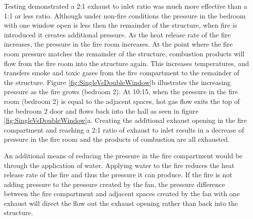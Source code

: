 \documentclass{article}
\begin{document}
Testing demonstrated a 2:1 exhaust to inlet ratio was much more effective than a 1:1 or less ratio. Although under non-fire conditions the pressure in the bedroom with one window open is less then the remainder of the structure, when fire is introduced it creates additional pressure. As the heat release rate of the fire increases, the pressure in the fire room increases. At the point where the fire room pressure matches the remainder of the structure, combustion products will flow from the fire room into the structure again. This increases temperatures, and transfers smoke and toxic gases from the fire compartment to the remainder of the structure. Figure \ref{fig:SingleVsDoubleWindow}b illustrates the increasing pressure as the fire grows (bedroom 2). At 10:15, when the pressure in the fire room (bedroom 2) is equal to the adjacent spaces, hot gas flow exits the top of the bedroom 2 door and flows back into the hall as seen in  figure \ref{fig:SingleVsDoubleWindow}a. Creating the additional exhaust opening in the fire compartment and reaching a 2:1 ratio of exhaust to inlet results in a decrease of pressure in the fire room and the products of combustion are all exhausted. 

An additional means of reducing the pressure in the fire compartment would be through the application of water. Applying water to the fire reduces the heat release rate of the fire and thus the pressure it can produce. If the fire is not adding pressure to the pressure created by the fan, the pressure difference between the fire compartment and adjacent spaces created by the fan with one exhaust will direct the flow out the exhaust opening rather than back into the structure. 
\end{document}
